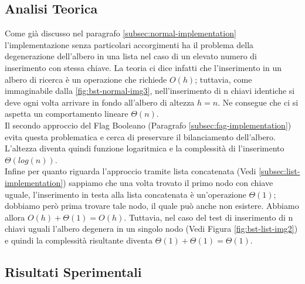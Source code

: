 \documentclass{article}
\begin{document}
\subsection{Analisi Teorica}

Come già discusso nel paragrafo \ref{subsec:normal-implementation} l'implementazione senza particolari accorgimenti ha il problema della degenerazione dell'albero in una lista nel caso di un elevato numero di inserimento con stessa chiave.
La teoria ci dice infatti che l'inserimento in un albero di ricerca è un operazione che richiede $O(h)$; tuttavia, come immaginabile dalla \cref{fig:bst-normal-img3}, nell'inserimento di n chiavi identiche si deve ogni volta arrivare in fondo all'albero di altezza $h=n$. Ne consegue che ci si aspetta un comportamento lineare $\Theta(n)$.
\\
Il secondo approccio del Flag Booleano (Paragrafo \ref{subsec:fag-implementation}) evita questa problematica e cerca di preservare il bilanciamento dell'albero. L'altezza diventa quindi funzione logaritmica e la complessità di l'inserimento $\Theta(log(n))$.
\\
Infine per quanto riguarda l'approccio tramite lista concatenata (Vedi \ref{subsec:list-implementation}) sappiamo che una volta trovato il primo nodo con chiave uguale, l'inserimento in testa alla lista concatenata è un'operazione $\Theta(1)$; dobbiamo però prima trovare tale nodo, il quale può anche non esistere. Abbiamo allora $O(h) + \Theta(1) = O(h)$. 
Tuttavia, nel caso del test di inserimento di n chiavi uguali l'albero degenera in un singolo nodo (Vedi Figura \ref{fig:bst-list-img2}) e quindi la complessità risultante diventa $\Theta(1) + \Theta(1) = \Theta(1)$.


\subsection{Risultati Sperimentali}
\end{document}
